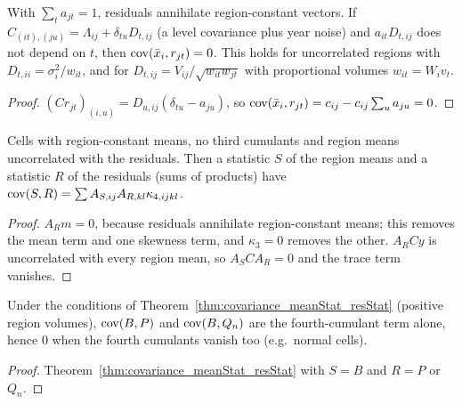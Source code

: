 \begin{lemma}\label{lem:meanResid_uncorr}
  \leanok
  With $\sum_t a_{jt} = 1$, residuals annihilate region-constant vectors. If
  $C_{(it),(ju)} = \Lambda_{ij} + \delta_{tu}D_{t,ij}$ (a level covariance plus year noise) and
  $a_{it}D_{t,ij}$ does not depend on $t$, then $\operatorname{cov}(\bar x_i, r_{jt}) = 0$. This holds for
  uncorrelated regions with $D_{t,ii} = \sigma_i^2/w_{it}$, and for
  $D_{t,ij} = V_{ij}/\sqrt{w_{it}w_{jt}}$ with proportional volumes $w_{it} = W_iv_t$.
\end{lemma}
\begin{proof}
  \leanok
  $(Cr_{jt})_{(i,u)} = D_{u,ij}(\delta_{tu} - a_{ju})$, so
  $\operatorname{cov}(\bar x_i, r_{jt}) = c_{ij} - c_{ij}\sum_u a_{ju} = 0$.
\end{proof}

\begin{theorem}\label{thm:covariance_meanStat_resStat}
  \leanok
  Cells with region-constant means, no third cumulants and region means uncorrelated with the
  residuals. Then a statistic $S$ of the region means and a statistic $R$ of the residuals
  (sums of products) have $\operatorname{cov}(S, R) = \sum A_{S,ij}A_{R,kl}\kappa_{4,ijkl}$.
\end{theorem}
\begin{proof}
  \leanok
  $A_Rm = 0$, because residuals annihilate region-constant means; this removes the mean term and one
  skewness term, and $\kappa_3 = 0$ removes the other. $A_RCy$ is uncorrelated with every region
  mean, so $A_SCA_R = 0$ and the trace term vanishes.
\end{proof}

\begin{theorem}[$\cov(B, P) = \cov(B, Q_n) = 0$]\label{thm:covariance_statB}
  \leanok
  Under the conditions of Theorem~\ref{thm:covariance_meanStat_resStat} (positive region volumes),
  $\operatorname{cov}(B, P)$ and $\operatorname{cov}(B, Q_n)$ are the fourth-cumulant term alone, hence $0$ when the fourth
  cumulants vanish too (e.g.\ normal cells).
\end{theorem}
\begin{proof}
  \leanok
  Theorem~\ref{thm:covariance_meanStat_resStat} with $S = B$ and $R = P$ or $Q_n$.
\end{proof}

